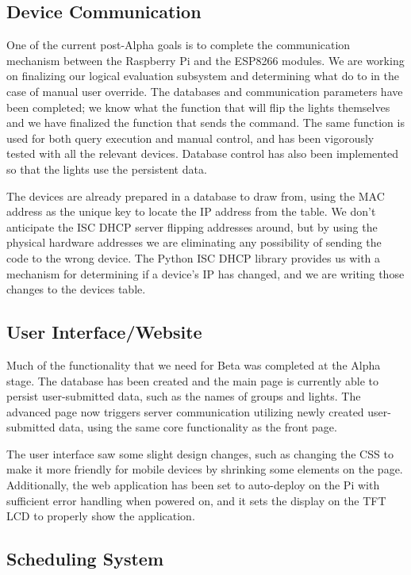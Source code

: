 \documentclass[10pt,draftclsnofoot,onecolumn]{IEEEtran}
\begin{document}
\subsection{Device Communication}

One of the current post-Alpha goals is to complete the communication mechanism
between the Raspberry Pi and the ESP8266 modules. We are working on finalizing
our logical evaluation subsystem and determining what do to in the case of
manual user override. The databases and communication parameters have been
completed; we know what the function that will flip the lights themselves and
we have finalized the function that sends the command. The same function is
used for both query execution and manual control, and has been vigorously
tested with all the relevant devices. Database control has also been implemented
so that the lights use the persistent data.

The devices are already prepared in a database to draw from, using the MAC
address as the unique key to locate the IP address from the table. We don't
anticipate the ISC DHCP server flipping addresses around, but by using the
physical hardware addresses we are eliminating any possibility of sending the
code to the wrong device. The Python ISC DHCP library provides us with a
mechanism for determining if a device's IP has changed, and we are writing those
changes to the devices table.

\subsection{User Interface/Website}

Much of the functionality that we need for Beta was completed at the Alpha stage.
The database has been created and the main page is currently able to persist
user-submitted data, such as the names of groups and lights.  The advanced page
now triggers server communication utilizing newly created
user-submitted data, using the same core functionality as the front page.

The user interface saw some slight design changes, such as changing the CSS
to make it more friendly for mobile devices by shrinking some elements on the
page. Additionally, the web application has been set to auto-deploy on the Pi
with sufficient error handling when powered on, and it sets the display on the
TFT LCD to properly show the application.

\subsection{Scheduling System}
\end{document}
